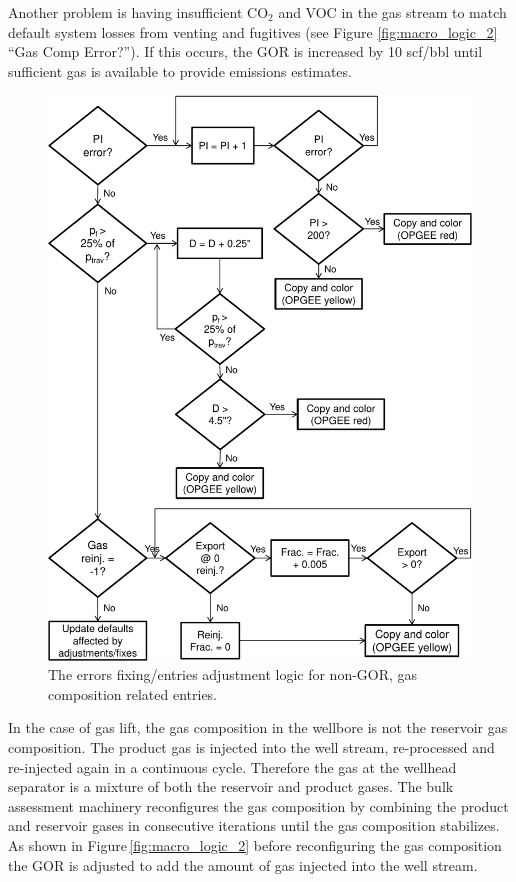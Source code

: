\documentclass[11pt]{report}
\begin{document}
Another problem is having insufficient CO$_{2}$ and VOC in the gas stream to match default system losses from venting and fugitives (see Figure \ref{fig:macro_logic_2} ``Gas Comp Error?''). If this occurs, the GOR is increased by 10 scf/bbl until sufficient gas is available to provide emissions estimates.


\begin{figure}[t]
\includegraphics[width=0.8\columnwidth]{images/macro_logic_3.pdf}
\caption{The errors fixing/entries adjustment logic for non-GOR, gas composition related entries.}
\label{fig:macro_logic_3}
\end{figure}

In the case of gas lift, the gas composition in the wellbore is not the reservoir gas composition. The product gas is injected into the well stream, re-processed and re-injected again in a continuous cycle. Therefore the gas at the wellhead separator is a mixture of both the reservoir and product gases. The bulk assessment machinery reconfigures the gas composition by combining the product and reservoir gases in consecutive iterations until the gas composition stabilizes. As shown in Figure\,\ref{fig:macro_logic_2} before reconfiguring the gas composition the GOR is adjusted to add the amount of gas injected into the well stream.\par
\end{document}

